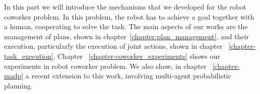 In this part we will introduce the mechanisms that we developed for the robot coworker problem. In this problem, the robot has to achieve a goal together with a human, cooperating to solve the task. The main aspects of our works are the management of plans, shown in chapter~\ref{chapter:plan_management}, and their execution, particularly the execution of joint actions, shown in chapter ~\ref{chapter-task_execution}. Chapter ~\ref{chapter-coworker_experiments} shows our experiments in robot coworker problem. We also show, in chapter ~\ref{chapter-madp} a recent extension to this work, involving multi-agent probabilistic planning.

 
%  
%  
